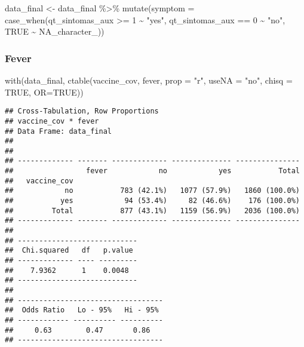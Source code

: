 \documentclass[
]{article}
\newenvironment{Shaded}{\begin{snugshade}}{\end{snugshade}}
\newcommand{\AttributeTok}[1]{\textcolor[rgb]{0.77,0.63,0.00}{#1}}
\newcommand{\ConstantTok}[1]{\textcolor[rgb]{0.00,0.00,0.00}{#1}}
\newcommand{\DecValTok}[1]{\textcolor[rgb]{0.00,0.00,0.81}{#1}}
\newcommand{\FunctionTok}[1]{\textcolor[rgb]{0.00,0.00,0.00}{#1}}
\newcommand{\NormalTok}[1]{#1}
\newcommand{\OtherTok}[1]{\textcolor[rgb]{0.56,0.35,0.01}{#1}}
\newcommand{\SpecialCharTok}[1]{\textcolor[rgb]{0.00,0.00,0.00}{#1}}
\newcommand{\StringTok}[1]{\textcolor[rgb]{0.31,0.60,0.02}{#1}}
\begin{document}
\begin{Shaded}
\begin{Highlighting}[]
\NormalTok{data\_final }\OtherTok{\textless{}{-}}\NormalTok{  data\_final }\SpecialCharTok{\%\textgreater{}\%}
  \FunctionTok{mutate}\NormalTok{(}\AttributeTok{symptom =} \FunctionTok{case\_when}\NormalTok{(qt\_sintomas\_aux }\SpecialCharTok{\textgreater{}=} \DecValTok{1} \SpecialCharTok{\textasciitilde{}} \StringTok{"yes"}\NormalTok{,}
\NormalTok{                             qt\_sintomas\_aux }\SpecialCharTok{==} \DecValTok{0} \SpecialCharTok{\textasciitilde{}} \StringTok{"no"}\NormalTok{,}
                             \ConstantTok{TRUE} \SpecialCharTok{\textasciitilde{}} \ConstantTok{NA\_character\_}\NormalTok{))}
\end{Highlighting}
\end{Shaded}

\hypertarget{fever}{%
\subsubsection{Fever}\label{fever}}

\begin{Shaded}
\begin{Highlighting}[]
\FunctionTok{with}\NormalTok{(data\_final, }\FunctionTok{ctable}\NormalTok{(vaccine\_cov, fever, }\AttributeTok{prop =} \StringTok{"r"}\NormalTok{, }\AttributeTok{useNA =} \StringTok{"no"}\NormalTok{, }\AttributeTok{chisq =} \ConstantTok{TRUE}\NormalTok{, }\AttributeTok{OR=}\ConstantTok{TRUE}\NormalTok{))}
\end{Highlighting}
\end{Shaded}

\begin{verbatim}
## Cross-Tabulation, Row Proportions  
## vaccine_cov * fever  
## Data Frame: data_final  
## 
## 
## ------------- ------- ------------- -------------- ---------------
##                 fever            no            yes           Total
##   vaccine_cov                                                     
##            no           783 (42.1%)   1077 (57.9%)   1860 (100.0%)
##           yes            94 (53.4%)     82 (46.6%)    176 (100.0%)
##         Total           877 (43.1%)   1159 (56.9%)   2036 (100.0%)
## ------------- ------- ------------- -------------- ---------------
## 
## ----------------------------
##  Chi.squared   df   p.value 
## ------------- ---- ---------
##    7.9362      1    0.0048  
## ----------------------------
## 
## ----------------------------------
##  Odds Ratio   Lo - 95%   Hi - 95% 
## ------------ ---------- ----------
##     0.63        0.47       0.86   
## ----------------------------------
\end{verbatim}
\end{document}
